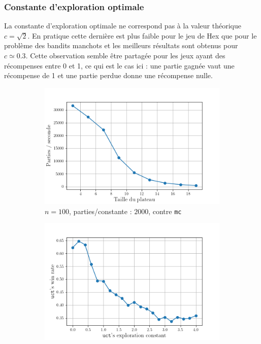 \documentclass[a4paper]{article}
\theoremstyle{definition}
\begin{document}
\subsubsection{Constante d'exploration optimale}

La constante d'exploration optimale ne correspond pas à la valeur théorique $c=\sqrt{2}$. En pratique cette dernière est plus faible pour le jeu de Hex que pour le problème des bandits manchots et les meilleurs résultats sont obtenus pour $c \simeq 0.3$. Cette observation semble être partagée pour les jeux ayant des récompenses entre 0 et 1, ce qui est le cas ici : une partie gagnée vaut une récompense de 1 et une partie perdue donne une récompense nulle.

\begin{figure}[!h]
	\centering
	\begin{subfigure}{0.32\textwidth}
		\centering
		\includegraphics[width=\textwidth]{test1.png}
		\caption{$n=100$, parties/constante : $2000$, contre \texttt{mc}}
		\label{fig:1_}
	\end{subfigure}
	\hfill
	\begin{subfigure}{0.32\textwidth}
		\centering
		\includegraphics[width=\textwidth]{test2.png}

\end{subfigure}
\end{figure}
\end{document}
